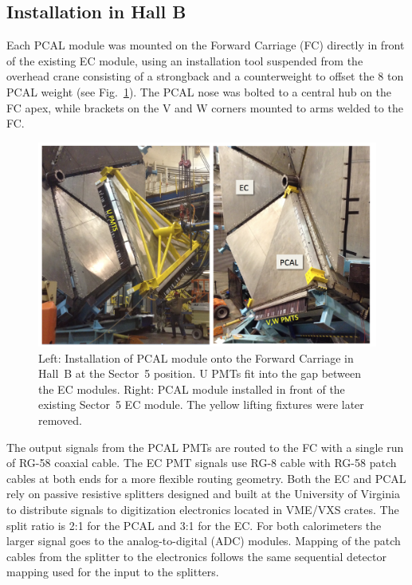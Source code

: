 \subsection{Installation in Hall B}

Each PCAL module was mounted on the Forward Carriage (FC) directly in front of the existing EC module, using
an installation tool suspended from the overhead crane consisting of a strongback and a counterweight to offset
the 8 ton PCAL weight (see Fig.~\ref{fig:S5_1}). The PCAL nose was bolted to a central hub on the FC apex, while
brackets on the V and W corners mounted to arms welded to the FC.   

\begin{figure}[hbt]
\centering
\includegraphics[width=0.95\columnwidth,keepaspectratio]{img/S5_1.png}
\caption{Left: Installation of PCAL module onto the Forward Carriage in Hall~B at the Sector~5 position. U PMTs
  fit into the gap between the EC modules. Right: PCAL module installed in front of the existing Sector~5 EC
  module. The yellow lifting fixtures were later removed.}
\label{fig:S5_1}
\end{figure}

The output signals from the PCAL PMTs are routed to the FC with a single run of RG-58 coaxial cable. The EC PMT
signals use RG-8 cable with RG-58 patch cables at both ends for a more flexible routing geometry. Both the EC and
PCAL rely on passive resistive splitters designed and built at the University of Virginia to distribute signals to 
digitization electronics located in VME/VXS crates. The split ratio is 2:1 for the PCAL and 3:1 for the EC. For both calorimeters the larger signal goes to the analog-to-digital (ADC) modules. Mapping of the patch cables from the
splitter to the electronics follows the same sequential detector mapping used for the input to the splitters.

